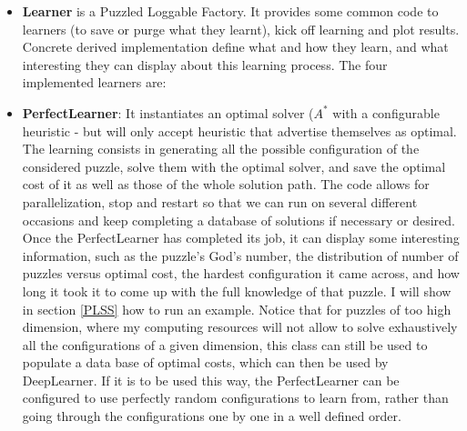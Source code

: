 \begin{itemize}
\item \textbf{Learner} is a Puzzled Loggable Factory. It provides some common code to learners (to save or purge what they learnt), kick off learning and plot results. Concrete derived implementation define what and how they learn, and what interesting they can display about this learning process. The four implemented learners are:
\item \textbf{PerfectLearner}: It instantiates an optimal solver ($A^{*}$ with a configurable heuristic - but will only accept heuristic that advertise themselves as optimal. The learning consists in generating all the possible configuration of the considered puzzle, solve them with the optimal solver, and save the optimal cost of it as well as those of the whole solution path. The code allows for parallelization, stop and restart so that we can run on several different occasions and keep completing a database of solutions if necessary or desired. Once the PerfectLearner has completed its job, it can display some interesting information, such as the puzzle's God's number, the distribution of number of puzzles versus optimal cost, the hardest configuration it came across, and how long it took it to come up with the full knowledge of that puzzle. I will show in section \ref{PLSS} how to run an example. Notice that for puzzles of too high dimension, where my computing resources will not allow to solve exhaustively all the configurations of a given dimension, this class can still be used to populate a data base of optimal costs, which can then be used by DeepLearner. If it is to be used this way, the PerfectLearner can be configured to use perfectly random configurations to learn from, rather than going through the configurations one by one in a well defined order.


\end{itemize}
